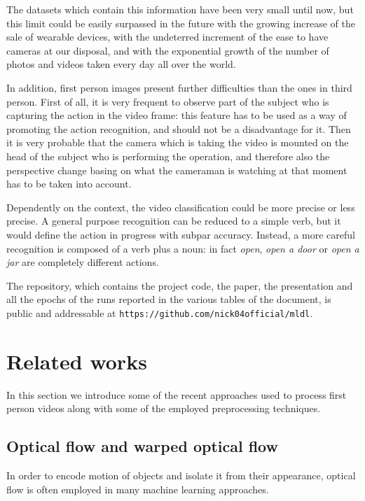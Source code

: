 \documentclass[10pt,twocolumn,letterpaper]{article}
\begin{document}
The datasets which contain this information have been very small until now, but this limit could be easily surpassed in the future with the growing increase of the sale of wearable devices, with the undeterred increment of the ease to have cameras at our disposal, and with the exponential growth of the number of photos and videos taken every day all over the world. 

In addition, first person images present further difficulties than the ones in third person. First of all, it is very frequent to observe part of the subject who is capturing the action in the video frame: this feature has to be used as a way of promoting the action recognition, and should not be a disadvantage for it. Then it is very probable that the camera which is taking the video is mounted on the head of the subject who is performing the operation, and therefore also the perspective change basing on what the cameraman is watching at that moment has to be taken into account.

Dependently on the context, the video classification could be more precise or less precise. A general purpose recognition can be reduced to a simple verb, but it would define the action in progress with subpar accuracy. Instead, a more careful recognition is composed of a verb plus a noun: in fact \emph{open}, \emph{open a door} or \emph{open a jar} are completely different actions.

The repository, which contains the project code, the paper, the presentation and all the epochs of the runs reported in the various tables of the document, is public and addressable at \texttt{https://github.com/nick04official/mldl}.

\section{Related works}

In this section we introduce some of the recent approaches used to process first person videos along with some of the employed preprocessing techniques.

\subsection{Optical flow and warped optical flow}

In order to encode motion of objects and isolate it from their appearance, optical flow is often employed in many machine learning approaches.
\end{document}
